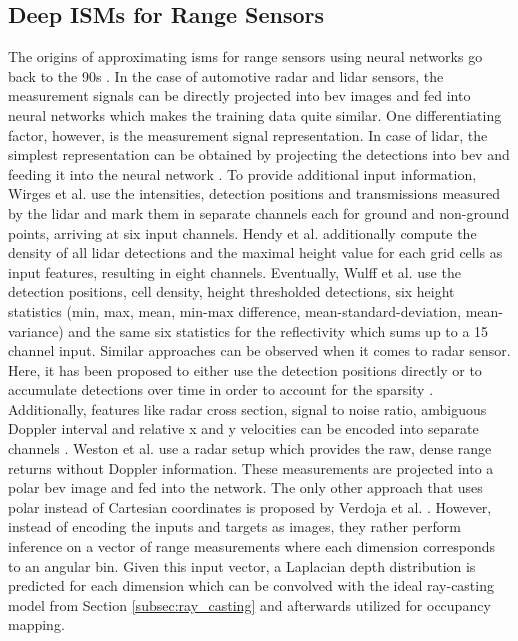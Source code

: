 \subsection{Deep ISMs for Range Sensors}
\label{subsec:deep_ism_range}
The origins of approximating \gls{ism}s for range sensors using neural networks go back to the 90s \cite{van1995neural,thrun1993exploration}. In the case of automotive radar and lidar sensors, the measurement signals can be directly projected into \gls{bev} images and fed into neural networks which makes the training data quite similar. One differentiating factor, however, is the measurement signal representation. In case of lidar, the simplest representation can be obtained by projecting the detections into \gls{bev} and feeding it into the neural network \cite{liang2018deep}. To provide additional input information, Wirges et al. \cite{wirges2018evidential} use the intensities, detection positions and transmissions measured by the lidar and mark them in separate channels each for ground and non-ground points, arriving at six input channels. Hendy et al. \cite{hendy2020fishing} additionally compute the density of all lidar detections and the maximal height value for each grid cells as input features, resulting in eight channels. Eventually, Wulff et al. \cite{wulff2018early} use the detection positions, cell density, height thresholded detections, six height statistics (min, max, mean, min-max difference, mean-standard-deviation, mean-variance) and the same six statistics for the reflectivity which sums up to a 15 channel input. Similar approaches can be observed when it comes to radar sensor. Here, it has been proposed to either use the detection positions directly \cite{sless2019road} or to accumulate detections over time in order to account for the sparsity \cite{prophet2019semantic,lombacher2017semantic}. Additionally, features like radar cross section, signal to noise ratio, ambiguous Doppler interval and relative x and y velocities can be encoded into separate channels \cite{hendy2020fishing}. Weston et al. \cite{weston2019probably} use a radar setup which provides the raw, dense range returns without Doppler information. These measurements are projected into a polar \gls{bev} image and fed into the network. The only other approach that uses polar instead of Cartesian coordinates is proposed by Verdoja et al. \cite{verdoja2019deep}. However, instead of encoding the inputs and targets as images, they rather perform inference on a vector of range measurements where each dimension corresponds to an angular bin. Given this input vector, a Laplacian depth distribution is predicted for each dimension which can be convolved with the ideal ray-casting model from Section \ref{subsec:ray_casting} and afterwards utilized for occupancy mapping.
%
